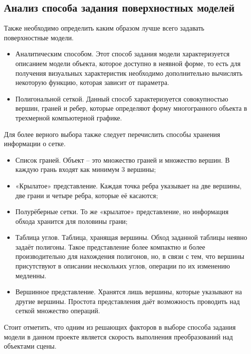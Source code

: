 \subsection{Анализ способа задания поверхностных моделей}

Также необходимо определить каким образом лучше всего задавать поверхностные модели.

\begin{itemize} 
\item Аналитическим способом. Этот способ задания модели характеризуется описанием модели объекта, которое доступно в неявной форме, то есть для получения визуальных характеристик необходимо дополнительно вычислять некоторую функцию, которая зависит от параметра.

\item Полигональной сеткой. Данный способ характеризуется совокупностью вершин, граней и ребер, которые определяют форму многогранного объекта в трехмерной компьютерной графике.

\end{itemize}


Для более верного выбора также следует перечислить способы хранения информации о сетке.

\begin{itemize}

\item Список граней. Объект – это множество граней и множество вершин. В каждую грань входят как минимум 3 вершины;
\item«Крылатое» представление. Каждая точка ребра указывает на две вершины, две грани и четыре ребра, которые её касаются;
\item Полурёберные сетки. То же «крылатое» представление, но информация обхода хранится для половины грани;
\item Таблица углов. Таблица, хранящая вершины. Обход заданной таблицы неявно задаёт полигоны. Такое представление более компактно и более производительно для нахождения полигонов, но, в связи с тем, что вершины присутствуют в описании нескольких углов, операции по их изменению медленны.
\item Вершинное представление. Хранятся лишь вершины, которые указывают на другие вершины. Простота представления даёт возможность проводить над сеткой множество операций.

\end{itemize}


Стоит отметить, что одним из решающих факторов в выборе способа задания модели в данном проекте является скорость выполнения преобразований над объектами сцены.

